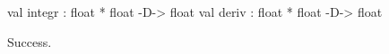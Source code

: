 \runverbatimtrue
{}
\begin{RunVerbatimMsg}
val integr : float * float -D-> float
val deriv : float * float -D-> float
\end{RunVerbatimMsg}
\begin{RunVerbatimErr}
Success.
\end{RunVerbatimErr}
